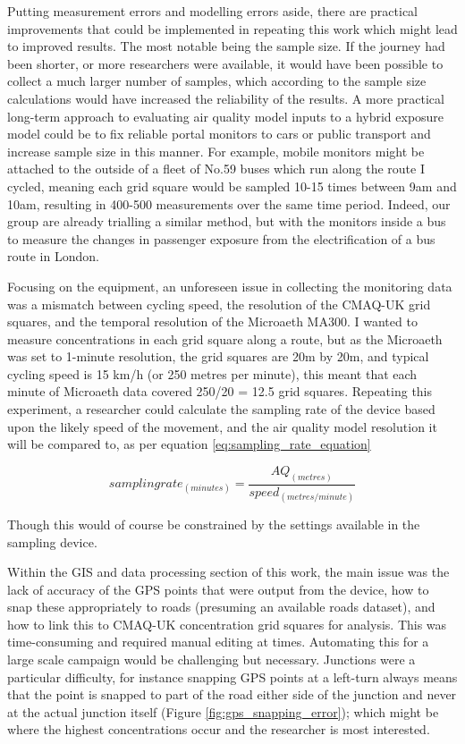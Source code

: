 Putting measurement errors and modelling errors aside, there are practical improvements that could be implemented in repeating this work which might lead to improved results. The most notable being the sample size. If the journey had been shorter, or more researchers were available, it would have been possible to collect a much larger number of samples, which according to the sample size calculations would have increased the reliability of the results. A more practical long-term approach to evaluating air quality model inputs to a hybrid exposure model could be to fix reliable portal monitors to cars or public transport and increase sample size in this manner. For example, mobile monitors might be attached to the outside of a fleet of No.59 buses which run along the route I cycled, meaning each grid square would be sampled 10-15 times between 9am and 10am, resulting in 400-500 measurements over the same time period. Indeed, our group are already trialling a similar method, but with the monitors inside a bus to measure the changes in passenger exposure from the electrification of a bus route in London.

Focusing on the equipment, an unforeseen issue in collecting the monitoring data was a mismatch between cycling speed, the resolution of the CMAQ-UK grid squares, and the temporal resolution of the Microaeth MA300. I wanted to measure concentrations in each grid square along a route, but as the Microaeth was set to 1-minute resolution, the grid squares are 20m by 20m, and typical cycling speed is 15 km/h (or 250 metres per minute), this meant that each minute of Microaeth data covered 250/20 = 12.5 grid squares. Repeating this experiment, a researcher could calculate the sampling rate of the device based upon the likely speed of the movement, and the air quality model resolution it will be compared to, as per equation \ref{eq:sampling_rate_equation}

\begin{equation}
  sampling rate_{(minutes)} = \frac{AQ_{(metres)}}{speed_{(metres/minute)}}
  \label{eq:sampling_rate_equation}
\end{equation}

Though this would of course be constrained by the settings available in the sampling device.

Within the GIS and data processing section of this work, the main issue was the lack of accuracy of the GPS points that were output from the device, how to snap these appropriately to roads (presuming an available roads dataset), and how to link this to CMAQ-UK concentration grid squares for analysis. This was time-consuming and required manual editing at times. Automating this for a large scale campaign would be challenging but necessary. Junctions were a particular difficulty, for instance snapping GPS points at a left-turn always means that the point is snapped to part of the road either side of the junction and never at the actual junction itself (Figure \ref{fig:gps_snapping_error}); which might be where the highest concentrations occur and the researcher is most interested.

